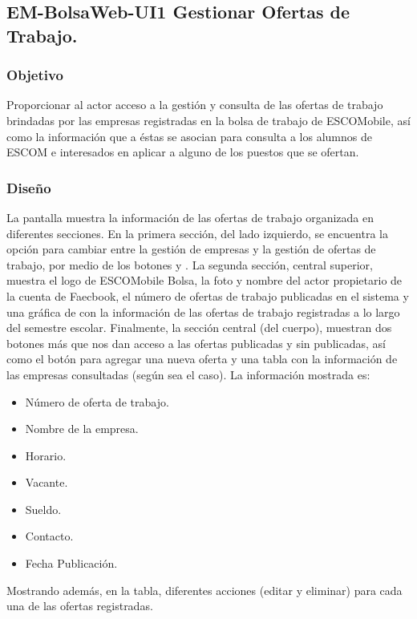 
\pagebreak

\subsection{EM-BolsaWeb-UI1 Gestionar Ofertas de Trabajo.}

\subsubsection{Objetivo}
	\noindent
	Proporcionar al actor acceso a la gestión y consulta de las ofertas de trabajo brindadas por las empresas registradas en la bolsa de trabajo de ESCOMobile, así como la información que a éstas se asocian para consulta a los alumnos de ESCOM e interesados en aplicar a alguno de los puestos que se ofertan. 

\subsubsection{Diseño}
	\noindent
	La pantalla muestra la información de las ofertas de trabajo organizada en diferentes secciones. En la primera sección, del lado izquierdo, se encuentra la opción para cambiar entre la gestión de empresas y la gestión de ofertas de trabajo, por medio de los botones  y . La segunda sección, central superior, muestra el logo de ESCOMobile Bolsa,  la foto y nombre del actor propietario de la cuenta de Faecbook, el número de ofertas de trabajo publicadas en el sistema y una gráfica de con la información de las ofertas de trabajo registradas a lo largo del semestre escolar. Finalmente, la sección central (del cuerpo), muestran dos botones más que nos dan acceso a las ofertas publicadas y sin publicadas, así como el botón  para agregar una nueva oferta y una tabla con la información de las empresas consultadas (según sea el caso). La información mostrada es:
	\begin{itemize}
		\item Número de oferta de trabajo.
		\item Nombre de la empresa.
		\item Horario.
		\item Vacante.
		\item Sueldo.
		\item Contacto.
		\item Fecha Publicación.
	\end{itemize}	
	Mostrando además, en la tabla, diferentes acciones (editar y eliminar) para cada una de las ofertas registradas.

